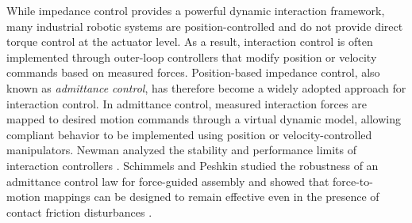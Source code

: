 \documentclass[journal]{IEEEtran}
\begin{document}
While impedance control provides a powerful dynamic interaction framework, many industrial robotic systems are position-controlled and do not provide direct torque control at the actuator level. As a result, interaction control is often implemented through outer-loop controllers that modify position or velocity commands based on measured forces. %
Position-based impedance control, also known as 
\emph{admittance control}, has therefore become a widely adopted approach for interaction control. In admittance control, measured interaction forces are mapped to desired motion commands through a virtual dynamic model, allowing compliant behavior to be implemented using position or velocity-controlled manipulators. Newman analyzed the stability and performance limits of interaction controllers \cite{Newman1992}.
Schimmels and Peshkin studied the robustness of an admittance control law for force-guided assembly and showed that force-to-motion mappings can be designed to remain effective even in the presence of contact friction disturbances \cite{Peshkin1992}.
\end{document}
